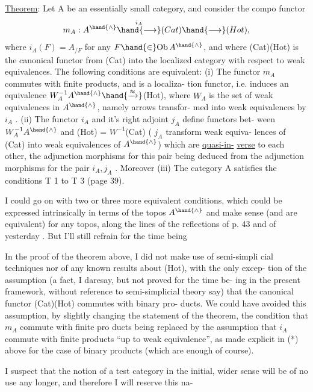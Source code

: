 
\uline{Theorem}: Let A be an essentially small category, and consider the compo
 functor
\[ m_A : A^{\hand{\wedge}} \overset{i_A}{\hand{\longrightarrow}} (Cat)\hand{\longrightarrow}(Hot) , \]
where $i_A(F) = A_{/F}$ for any $F \hand{\in} \mathrm{Ob}\, A^{\hand{\wedge}}$, and where (Cat)\hand{$\longrightarrow$}(Hot) is the
canonical functor from (Cat) into the localized category with respect to
weak equivalences. The following conditions are equivalent:
(i) The functor $m_A$ commutes with finite products, and is a localiza-
tion functor, i.e. induces an equivalence $W_A^{-1}A^{\hand{\wedge}} \hand{\xrightarrow{\approx}}$(Hot), where
$W_A$ is the set of weak equivalences in $A^{\hand{\wedge}}$, namely arrows transfor-
med into weak equivalences by $i_A$ . 
(ii) The functor $i_A$ and it's right adjoint $j_A$  define functors bet-
ween $W_A^{-1}A^{\hand{\wedge}}$ and (Hot) = $W^{-1}$(Cat) ( $j_A$  transform weak equiva-
lences of (Cat) into weak equivalences of $A^{\hand{\wedge}}$) which are \uline{quasi-in-}%
\uline{verse} to each other, the adjunction morphisms for this pair being
deduced from the adjunction morphisms for the pair $i_A, j_A$ . Moreover
(iii) The category A satisfies the  conditions T 1 to T 3
(page 39).

I could go on with two or three more equivalent conditions, which
could be expressed intrinsically in terms of the topos $A^{\hand{\wedge}}$ and make sense
(and are equivalent) for any topos, along the lines of the reflections of
p. 43 and of yesterday . But I'll still refrain for the time being\hand{!}

In the proof of the theorem above, I did not make use of semi-simpli%
cial techniques nor of any known results about (Hot), with the only excep-%
tion of the assumption (a fact, I daresay, but not proved for the time be-%
ing in the present framework, without reference to semi-simplicial theory
say) that the canonical functor (Cat)\hand{$\longrightarrow$}(Hot) commutes with binary pro-%
ducts. We could have avoided this assumption, by slightly changing the
statement of the theorem, the condition that $m_A$ commute with finite pro\hand{-}%
ducts  being replaced by the assumption that $i_A$ commute with finite products
``up to weak equivalence'', as made explicit in (*) above for the case of
binary products (which are enough of course).

I suspect that the notion of a test category in the initial, wider
sense will be of no use any longer, and therefore I will reserve this na-%
